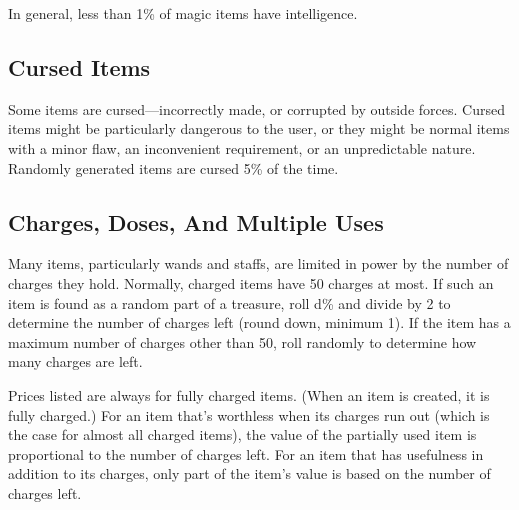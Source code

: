 In general, less than 1\% of magic items have intelligence.

\subsection{Cursed Items}
Some items are cursed---incorrectly made, or corrupted by outside forces. Cursed items might be particularly dangerous to the user, or they might be normal items with a minor flaw, an inconvenient requirement, or an unpredictable nature. Randomly generated items are cursed 5\% of the time.

\subsection{Charges, Doses, And Multiple Uses}
Many items, particularly wands and staffs, are limited in power by the number of charges they hold. Normally, charged items have 50 charges at most. If such an item is found as a random part of a treasure, roll d\% and divide by 2 to determine the number of charges left (round down, minimum 1). If the item has a maximum number of charges other than 50, roll randomly to determine how many charges are left.

Prices listed are always for fully charged items. (When an item is created, it is fully charged.) For an item that's worthless when its charges run out (which is the case for almost all charged items), the value of the partially used item is proportional to the number of charges left. For an item that has usefulness in addition to its charges, only part of the item's value is based on the number of charges left.